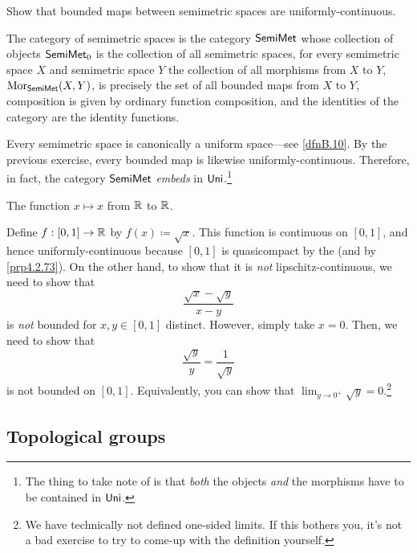 \begin{exr}
Show that bounded maps between semimetric spaces are uniformly-continuous.
\end{exr}
\begin{exm}
The category of semimetric spaces is the category $\mathsf{Semi} \mathsf{Met}$ whose collection of objects $\mathsf{Semi} \mathsf{Met} _0$ is the collection of all semimetric spaces, for every semimetric space $X$ and semimetric space $Y$ the collection of all morphisms from $X$ to $Y$, $\operatorname{Mor} _{\mathsf{Semi} \mathsf{Met}}(X,Y)$, is precisely the set of all bounded maps from $X$ to $Y$, composition is given by ordinary function composition, and the identities of the category are the identity functions.
\begin{rmk}
Every semimetric space is canonically a uniform space---see \cref{dfnB.10}.  By the previous exercise, every bounded map is likewise uniformly-continuous.  Therefore, in fact, the category $\mathsf{Semi} \mathsf{Met}$ \emph{embeds} in $\mathsf{Uni}$.\footnote{The thing to take note of is that \emph{both} the objects \emph{and} the morphisms have to be contained in $\mathsf{Uni}$.}
\end{rmk}
\end{exm}
\begin{exm}
The function $x\mapsto x$ from $\mathbb{R}$ to $\mathbb{R}$.
\end{exm}
\begin{exm}
Define $f:[0,1]\rightarrow \mathbb{R}$ by $f(x)\coloneqq \sqrt{x}$.  This function is continuous on $[0,1]$, and hence uniformly-continuous because $[0,1]$ is quasicompact by the  (and by \cref{prp4.2.73}).  On the other hand, to show that it is \emph{not} lipschitz-continuous, we need to show that
\begin{equation}
\frac{\sqrt{x}-\sqrt{y}}{x-y}
\end{equation}
is \emph{not} bounded for $x,y\in [0,1]$ distinct.  However, simply take $x=0$.  Then, we need to show that
\begin{equation}
\frac{\sqrt{y}}{y}=\frac{1}{\sqrt{y}}
\end{equation}
is not bounded on $[0,1]$.  Equivalently, you can show that $\lim _{y\to 0^+}\sqrt{y}=0$.\footnote{We have technically not defined one-sided limits.  If this bothers you, it's not a bad exercise to try to come-up with the definition yourself.}
\end{exm}

\subsection{Topological groups}

